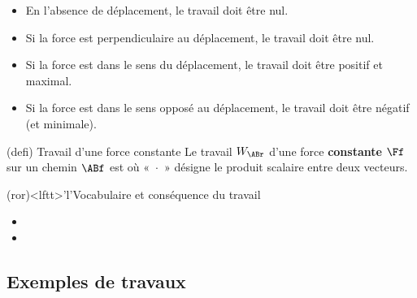 \documentclass[../../main/main.tex]{subfiles}
\begin{document}
\begin{itemize}
	\item En l'absence de déplacement, le travail doit être nul.
	\item Si la force est perpendiculaire au déplacement, le travail doit être
	      nul.
	\item Si la force est dans le sens du déplacement, le travail doit être
	      positif et maximal.
	\item Si la force est dans le sens opposé au déplacement, le travail doit
	      être négatif (et minimale).
\end{itemize}

\begin{tcb*}[sidebyside, sidebyside align=top](defi)
	{Travail d'une force constante}
	Le travail $W_{\ABr}$ d'une force \textbf{constante} $\Ff$ sur un chemin $\ABf$ est
	\psw{
		\[\boxed{W_{\ABr}(\Ff) = \Ff\cdot\ABf}\]
	}
	où «~$\cdot$~» désigne le produit scalaire entre deux vecteurs.
	\tcblower
\end{tcb*}

\begin{tcb*}(ror)<lftt>'l'{Vocabulaire et conséquence du travail}
	\begin{itemize}
		\item {}
		\item {}
	\end{itemize}
\end{tcb*}

\subsection{Exemples de travaux}
\end{document}
